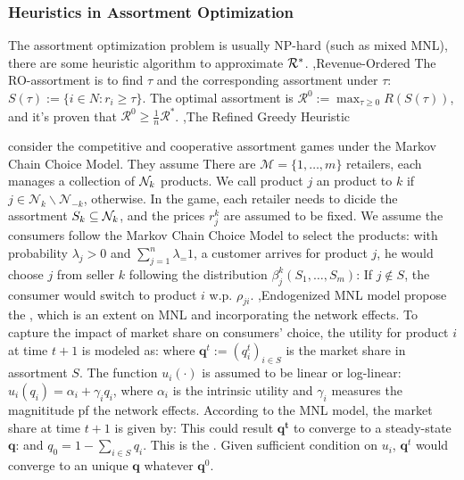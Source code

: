 \documentclass[12pt]{report}
\begin{document}
\subsubsection{Heuristics in Assortment Optimization}
The assortment optimization problem is usually NP-hard (such as mixed MNL), there are some heuristic algorithm to approximate $\mathcal{R}^*$.
\sep{Revenue-Ordered}
The RO-assortment is to find $\tau$ and the corresponding assortment under $\tau$: $S(\tau):=\{i\in N:r_i\geq\tau\}.$ The optimal assortment is 
$\mathcal{R}^0:=\max_{\tau\geq0}R(S(\tau))$, and it's proven that $\mathcal{R}^0\geq\frac1n\mathcal{R}^*$.
\sep{The Refined Greedy Heuristic}

\cite{NiP2021} consider the competitive and cooperative assortment games under the Markov Chain Choice Model. They assume There are $\mathcal{M}=\{1,\ldots,m\}$ retailers, each manages a
collection of $\mathcal{N}_k$ products. We call product $j$ an  product to $k$ if $j\in\mathcal{N}_{k}\backslash\mathcal{N}_{-k}$,  otherwise. In the game, each retailer needs to dicide
the assortment $S_k \subseteq \mathcal{N}_k$, and the prices $r_j^k$ are assumed to be fixed. We assume the consumers follow the Markov Chain Choice Model to select the products: with probability $\lambda_j>0$ and $\sum_{j=1}^n \lambda_=1$, a customer
arrives for product $j$, he would choose $j$ from seller $k$ following the distribution $\beta_j^k(S_1,\ldots,S_m)$:
If $j\notin S$, the consumer would switch to product $i$ w.p. $\rho_{ji}$.
\sep{Endogenized MNL model}
\cite{wang2017consumer} propose the , which is an extent on MNL and incorporating the network effects.
To capture the impact of market share on consumers’ choice, the utility for product $i$ at time $t+1$ is modeled as:
where $\mathbf{q}^t:=(q_i^t)_{i\in S}$ is the market share in assortment $S$. The function $u_i(\cdot)$ is assumed to be linear or log-linear:
$u_{i}(q_{i})=\alpha_{i}+\gamma_{i}q_{i}$, where $\alpha_i$ is the intrinsic utility and $\gamma_i$ measures the magnititude pf the network effects.
According to the MNL model, the market share at time $t+1$ is given by:
This could result $\mathbf{q^t}$ to converge to a steady-state $\mathbf{q}$:
and $q_0=1-\sum_{i\in S}q_i$. This is the . Given sufficient condition on $u_i$, $\mathbf{q}^t$ would converge to an unique $\mathbf{q}$
whatever $\mathbf{q}^0$.
\end{document}
